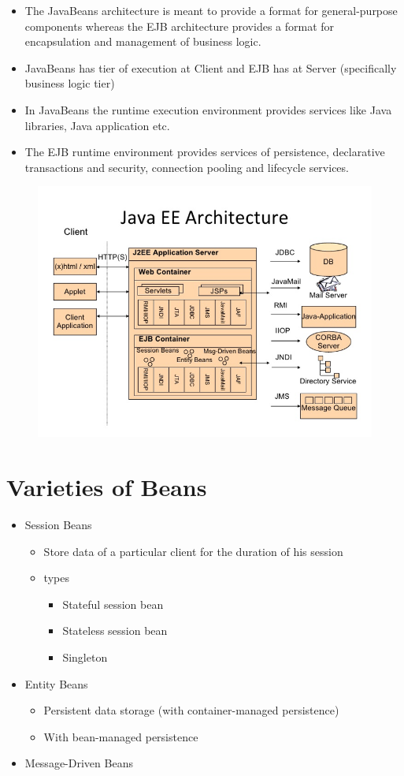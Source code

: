 \begin{itemize}
	\item The JavaBeans architecture is meant to provide a format for
	general-purpose components whereas the EJB architecture
	provides a format for encapsulation and management of
	business logic.
	\item JavaBeans has tier of execution at Client and EJB has at
	Server (specifically business logic tier)
	\item In JavaBeans the runtime execution environment provides
	services like Java libraries, Java application etc.
	\item The EJB runtime environment provides services of
	persistence, declarative transactions and security, connection
	pooling and lifecycle services.
\end{itemize}

 
\begin{figure}[tbph!]
	\centering
	\includegraphics[width=0.7\linewidth]{images/javaeearchitecture}
	\caption{}
	\label{fig:javaeearchitecture}
\end{figure}

\section{Varieties of Beans}

\begin{itemize}
	\item Session Beans
	\begin{itemize}
		\item Store data of a particular client for the duration of his session
		\item types
		\begin{itemize}
		\item Stateful session bean
		\item Stateless session bean
		\item Singleton
		\end{itemize}
	\end{itemize}
	\item Entity Beans
	\begin{itemize}
		\item Persistent data storage (with container-managed persistence)
		\item With bean-managed persistence
	\end{itemize}
	\item Message-Driven Beans
\end{itemize}
